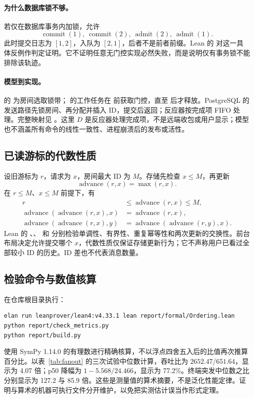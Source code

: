 \paragraph{为什么数据库锁不够。}
若仅在数据库事务内加锁，允许
\[
\operatorname{commit}(1),\ \operatorname{commit}(2),\
\operatorname{admit}(2),\ \operatorname{admit}(1).
\]
此时提交日志为 \([1,2]\)，入队为 \([2,1]\)，后者不是前者前缀。Lean 的  对这一具体反例作判定证明。它不证明任意无门控实现必然失败，而是说明仅有事务锁不能排除该轨迹。

\paragraph{模型到实现。}
 的  为房间选取锁带； 的工作任务在  前获取门控，直至  后才释放。PostgreSQL 的发送路径先锁房间、再分配并插入 ID，提交后返回；反应器按完成项 FIFO 处理。完整映射见 。这里 \(D\) 是反应器处理完成项，不是远端收包或用户显示；模型也不涵盖所有命令的线性一致性、进程崩溃后的发布或活性。

\subsection{已读游标的代数性质}
设旧游标为 \(r\)，请求为 \(x\)，房间最大 ID 为 \(M\)。存储先检查 \(x\leq M\)，再更新
\[
\operatorname{advance}(r,x)=\max(r,x).
\]
在 \(r\leq M\)、\(x\leq M\) 前提下，有
\begin{align*}
r&\leq\operatorname{advance}(r,x)\leq M,\\
\operatorname{advance}(\operatorname{advance}(r,x),x)
 &=\operatorname{advance}(r,x),\\
\operatorname{advance}(\operatorname{advance}(r,x),y)
 &=\operatorname{advance}(\operatorname{advance}(r,y),x).
\end{align*}
Lean 的 、、 和  分别检验单调性、有界性、重复幂等性和两次更新的交换性。前台布局决定允许提交哪个 \(x\)，代数性质仅保证存储更新行为；它不声称用户已看过全部较小 ID 的历史。ID 差也不代表消息数量。

\subsection{检验命令与数值核算}
在仓库根目录执行：
\begin{lstlisting}
elan run leanprover/lean4:v4.33.1 lean report/formal/Ordering.lean
python report/check_metrics.py
python report/build.py
\end{lstlisting}
 使用 SymPy 1.14.0 的有理数进行精确核算，不以浮点四舍五入后的比值再次推算百分比。以表~\ref{tab:fanout} 的三次试验中位数计算，吞吐比为 \(2652.47/651.64\)，显示为 4.07 倍；p50 降幅为 \(1-5.568/24.466\)，显示为 77.2\%。终端突发中位数之比分别显示为 127.2 与 85.9 倍。这些是测量值的算术摘要，不是泛化性能定律。证明与算术的机器可执行文件分开维护，以免把实测估计误当作形式定理。
